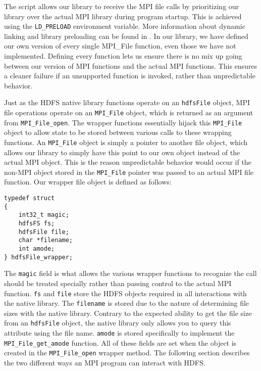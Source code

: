 The script allows our library to receive the MPI file calls by prioritizing our library over the actual MPI library during program startup. This is achieved using the \texttt{LD\_PRELOAD} environment variable. More information about dynamic linking and library preloading can be found in \cite{ld.so}. In our library, we have defined our own version of every single MPI\_File function, even those we have not implemented. Defining every function lets us ensure there is no mix up going between our version of MPI functions and the actual MPI functions. This ensures a cleaner failure if an unsupported function is invoked, rather than unpredictable behavior. 

Just as the HDFS native library functions operate on an \texttt{hdfsFile} object, MPI file operations operate on an \texttt{MPI\_File} object, which is returned as an argument from \texttt{MPI\_File\_open}. The wrapper functions essentially hijack this \texttt{MPI\_File} object to allow state to be stored between various calls to these wrapping functions. An \texttt{MPI\_File} object is simply a pointer to another file object, which allows our library to simply have this point to our own object instead of the actual MPI object. This is the reason unpredictable behavior would occur if the non-MPI object stored in the \texttt{MPI\_File} pointer was passed to an actual MPI file function. Our wrapper file object is defined as follows:

\begin{lstlisting}
typedef struct
{
	int32_t magic;
	hdfsFS fs;
	hdfsFile file;
	char *filename;
	int amode;
} hdfsFile_wrapper;
\end{lstlisting}

The \texttt{magic} field is what allows the various wrapper functions to recognize the call should be treated specially rather than passing control to the actual MPI function. \texttt{fs} and \texttt{file} store the HDFS objects required in all interactions with the native library. The \texttt{filename} is stored due to the nature of determining file sizes with the native library. Contrary to the expected ability to get the file size from an \texttt{hdfsFile} object, the native library only allows you to query this attribute using the file name. \texttt{amode} is stored specifically to implement the \texttt{MPI\_File\_get\_amode} function. All of these fields are set when the object is created in the \texttt{MPI\_File\_open} wrapper method. The following section describes the two different ways an MPI program can interact with HDFS.


